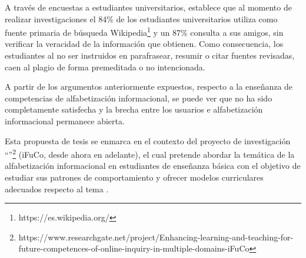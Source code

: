 A través de encuestas a estudiantes universitarios, \textcite[p.~475]{head2013project} establece que al momento de realizar investigaciones el 84\% de los estudiantes universitarios utiliza como fuente primaria de búsqueda Wikipedia\footnote{https://es.wikipedia.org/} y un 87\% consulta a sus amigos, sin verificar la veracidad de la información que obtienen. Como consecuencia, los estudiantes al no ser instruidos en parafrasear, resumir o citar fuentes revisadas, caen al plagio de forma premeditada o no intencionada. 

A partir de los argumentos anteriormente expuestos, respecto a la enseñanza de competencias de alfabetización informacional, se puede ver que no ha sido completamente satisfecha y la brecha entre los usuarios e alfabetización informacional permanece abierta.

Esta propuesta de tesis se enmarca en el contexto del proyecto de investigación “”\footnote{https://www.researchgate.net/project/Enhancing-learning-and-teaching-for-future-competences-of-online-inquiry-in-multiple-domains-iFuCo} (iFuCo, desde ahora en adelante), el cual pretende abordar la temática de la alfabetización informacional en estudiantes de enseñanza básica con el objetivo de estudiar sus patrones de comportamiento y ofrecer modelos curriculares adecuados respecto al tema \parencite{sormen2017performance}.


%




